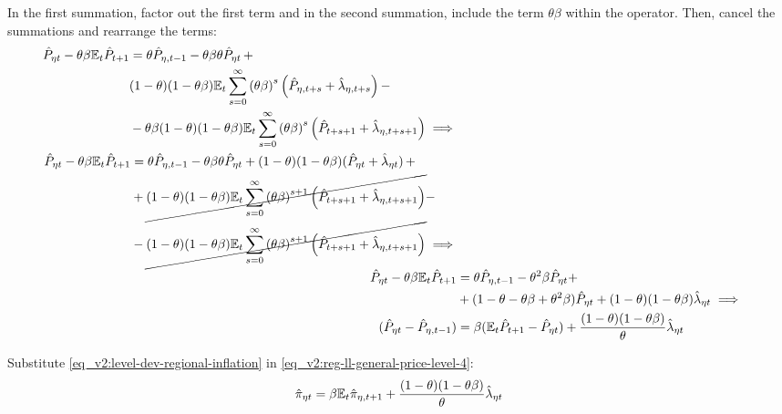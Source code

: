 \documentclass[../thesis.tex]{subfiles}
\begin{document}
In the first summation, factor out the first term and in the second summation, include the term $\theta \beta$ within the operator. Then, cancel the summations and rearrange the terms:
\begin{align}
	\begin{split}
		\hat{P}_{\eta t} - \theta \beta {\mathbb{E}_{t}} \hat{P}_{t+1} &= \theta \hat{P}_{\eta, t-1} - \theta \beta \theta \hat{P}_{\eta t} \, + \\
		& (1-\theta) (1- \theta \beta) {\mathbb{E}_{t}} \sum_{s=0}^{\infty} \left( \theta \beta \right)^s \left( \hat{P}_{\eta, t+s} + \hat{\lambda}_{\eta, t+s} \right) -
		\\
		& - \theta \beta (1-\theta) (1- \theta \beta) {\mathbb{E}_{t}} \sum_{s=0}^{\infty} \left( \theta \beta \right)^s \left( \hat{P}_{t+s+1} + \hat{\lambda}_{\eta, t+s+1} \right) \implies \nonumber 
	\end{split} \\
	\begin{split}
		\hat{P}_{\eta t} - \theta \beta {\mathbb{E}_{t}} \hat{P}_{t+1} &= \theta \hat{P}_{\eta, t-1} - \theta \beta \theta \hat{P}_{\eta t} + (1-\theta) (1- \theta \beta) (\hat{P}_{\eta t} + \hat{\lambda}_{\eta t}) \, + 
		\\
		& + \cancel{(1-\theta) (1- \theta \beta) {\mathbb{E}_{t}} \sum_{s=0}^{\infty} \left( \theta \beta \right)^{s+1} \left( \hat{P}_{t+s+1} + \hat{\lambda}_{\eta, t+s+1} \right)} -
		\\
		& - \cancel{(1-\theta) (1- \theta \beta) {\mathbb{E}_{t}} \sum_{s=0}^{\infty} \left( \theta \beta \right)^{s+1} \left( \hat{P}_{t+s+1} + \hat{\lambda}_{\eta, t+s+1} \right)} \implies \nonumber 
	\end{split} \\
	\hat{P}_{\eta t} - \theta \beta {\mathbb{E}_{t}} \hat{P}_{t+1} &= \theta \hat{P}_{\eta, t-1} - \theta^2 \beta \hat{P}_{\eta t} + \nonumber \\
	& + (1- \theta -\theta \beta + \theta^2 \beta) \hat{P}_{\eta t} + (1-\theta) (1- \theta \beta) \hat{\lambda}_{\eta t} \implies \nonumber \\
	(\hat{P}_{\eta t} - \hat{P}_{\eta, t-1}) &= \beta ({\mathbb{E}_{t}} \hat{P}_{t+1} - \hat{P}_{\eta t}) + \frac{(1-\theta) (1- \theta \beta)}{\theta} \hat{\lambda}_{\eta t}
	\label{eq_v2:reg-ll-general-price-level-4}
\end{align}

Substitute \ref{eq_v2:level-dev-regional-inflation} in \ref{eq_v2:reg-ll-general-price-level-4}:
\begin{align}
	\hat{\pi}_{\eta t} = \beta {\mathbb{E}_{t}} \hat{\pi}_{\eta, t+1} + \frac{(1-\theta) (1- \theta \beta)}{\theta} \hat{\lambda}_{\eta t} \label{eq_v2:reg-nk-phillips-curve-mc}
\end{align}
\end{document}
